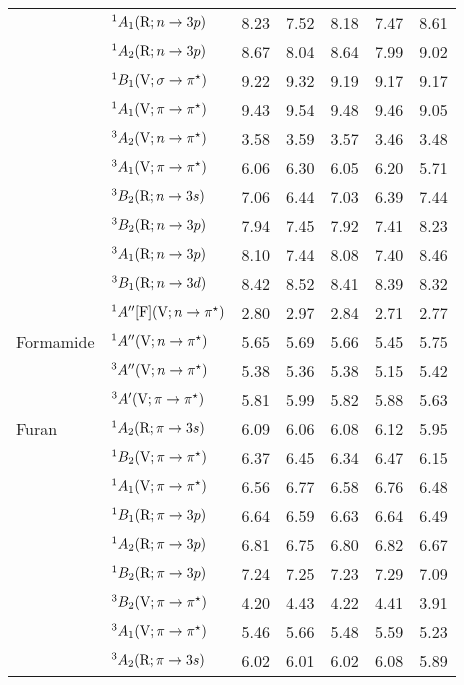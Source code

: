 \begin{tabular}{p{3.5cm}p{3.3cm}c|cccc}
        &$^1A_1 (\mathrm{R};n \rightarrow 3p)$ 					&8.23	&7.52	&8.18	&7.47	&8.61 	\\
        &$^1A_2 (\mathrm{R};n \rightarrow 3p)$ 					&8.67	&8.04	&8.64	&7.99	&9.02	\\
        &$^1B_1 (\mathrm{V};\sigma \rightarrow \pi^\star)$				&9.22	&9.32	&9.19	&9.17	&9.17	\\
        &$^1A_1 (\mathrm{V};\pi \rightarrow \pi^\star)$				&9.43	&9.54	&9.48	&9.46	&9.05 	\\
        &$^3A_2 (\mathrm{V};n \rightarrow \pi^\star)$ 					&3.58	&3.59	&3.57	&3.46	&3.48 	\\
        &$^3A_1 (\mathrm{V};\pi \rightarrow \pi^\star)$				&6.06	&6.30	&6.05	&6.20	&5.71	\\
        &$^3B_2 (\mathrm{R};n \rightarrow 3s)$ 					&7.06	&6.44	&7.03	&6.39	&7.44 	\\
        &$^3B_2 (\mathrm{R};n \rightarrow 3p)$ 					&7.94	&7.45	&7.92	&7.41	&8.23	\\
        &$^3A_1 (\mathrm{R};n \rightarrow 3p)$ 					&8.10	&7.44	&8.08	&7.40	&8.46	\\
        &$^3B_1 (\mathrm{R};n \rightarrow 3d)$ 					&8.42	&8.52	&8.41	&8.39	&8.32 	\\
        &$^1A^{\prime\prime} [\mathrm{F}] (\mathrm{V};n \rightarrow \pi^\star)$				&2.80	&2.97	&2.84	&2.71	&2.77 	\\
  Formamide	&$^1A^{\prime\prime} (\mathrm{V};n \rightarrow \pi^\star)$					&5.65	&5.69	&5.66	&5.45	&5.75	\\
        &$^3A^{\prime\prime} (\mathrm{V};n \rightarrow \pi^\star)$					&5.38	&5.36	&5.38	&5.15	&5.42	\\
        &$^3A^\prime (\mathrm{V};\pi \rightarrow \pi^\star)$					&5.81	&5.99	&5.82	&5.88	&5.63	\\
  Furan		&$^1A_2 (\mathrm{R}; \pi \rightarrow 3s)$				& 6.09 	&6.06	&6.08	&6.12	&5.95\\
        &$^1B_2 (\mathrm{V}; \pi \rightarrow \pi^\star)$				& 6.37 	&6.45	&6.34	&6.47	&6.15\\
        &$^1A_1 (\mathrm{V}; \pi \rightarrow \pi^\star)$				& 6.56 	&6.77	&6.58	&6.76	&6.48\\
        &$^1B_1  (\mathrm{R}; \pi \rightarrow 3p)$				& 6.64	&6.59	&6.63	&6.64	&6.49\\
        &$^1A_2  (\mathrm{R}; \pi \rightarrow 3p)$				& 6.81 	&6.75	&6.80	&6.82	&6.67\\
        &$^1B_2  (\mathrm{R}; \pi \rightarrow 3p)$				& 7.24    	&7.25	&7.23	&7.29	&7.09 \\	
        &$^3B_2 (\mathrm{V}; \pi \rightarrow \pi^\star)$				& 4.20    	&4.43	&4.22	&4.41	&3.91 \\	
        &$^3A_1 (\mathrm{V}; \pi \rightarrow \pi^\star)$				& 5.46    	&5.66	&5.48	&5.59	&5.23 \\	
        &$^3A_2 (\mathrm{R}; \pi \rightarrow 3s)$				& 6.02    	&6.01	&6.02	&6.08	&5.89 \\	

\end{tabular}
